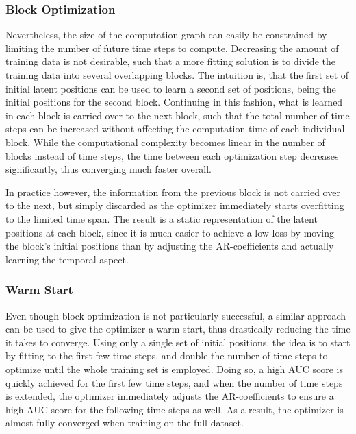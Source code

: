     \subsubsection{Block Optimization}
    
        Nevertheless, the size of the computation graph can easily be constrained by limiting the number of future time steps to compute. Decreasing the amount of training data is not desirable, such that a more fitting solution is to divide the training data into several overlapping blocks. 
        The intuition is, that the first set of initial latent positions can be used to learn a second set of positions, being the initial positions for the second block. Continuing in this fashion, what is learned in each block is carried over to the next block, such that the total number of time steps can be increased without affecting the computation time of each individual block. 
        While the computational complexity becomes linear in the number of blocks instead of time steps, the time between each optimization step decreases significantly, thus converging much faster overall.
        
        In practice however, the information from the previous block is not carried over to the next, but simply discarded as the optimizer immediately starts overfitting to the limited time span. The result is a static representation of the latent positions at each block, since it is much easier to achieve a low loss by moving the block's initial positions than by adjusting the AR-coefficients and actually learning the temporal aspect.
        
    \subsubsection{Warm Start}
    
        Even though block optimization is not particularly successful, a similar approach can be used to give the optimizer a warm start, thus drastically reducing the time it takes to converge. Using only a single set of initial positions, the idea is to start by fitting to the first few time steps, and double the number of time steps to optimize until the whole training set is employed. Doing so, a high AUC score is quickly achieved for the first few time steps, and when the number of time steps is extended, the optimizer immediately adjusts the AR-coefficients to ensure a high AUC score for the following time steps as well. As a result, the optimizer is almost fully converged when training on the full dataset.
    
